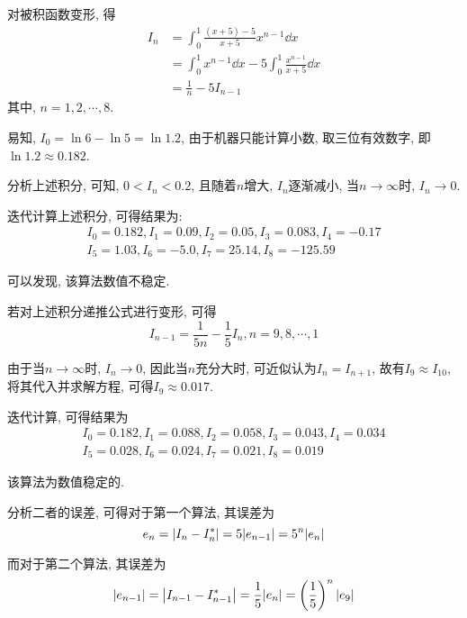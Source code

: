 \begin{solution}
    对被积函数变形, 得
    \begin{align*}
        I_n &= \int_0^1\frac{(x+5)-5}{x+5}x^{n-1}\dd{x}\\
            &= \int_0^1x^{n-1}\dd{x}-5\int_0^1\frac{x^{n-1}}{x+5}\dd{x}\\
            &= \frac{1}{n}-5I_{n-1}
    \end{align*}
    其中, $n=1,2,\cdots,8$.

    易知, $I_0=\ln{6}-\ln{5}=\ln{1.2}$, 由于机器只能计算小数, 取三位有效数字, 即$\ln{1.2}\approx0.182$.

    分析上述积分, 可知, $0<I_n<0.2$, 且随着$n$增大, $I_n$逐渐减小, 当$n\to\infty$时, $I_n\to0$.

    迭代计算上述积分, 可得结果为:
    \begin{align*}
        I_0=0.182, I_1=0.09, I_2=0.05, I_3=0.083, I_4=-0.17\\
        I_5=1.03, I_6=-5.0, I_7=25.14, I_8=-125.59
    \end{align*}

    可以发现, 该算法数值不稳定.

    若对上述积分递推公式进行变形, 可得
    \begin{equation*}
        I_{n-1}=\frac{1}{5n}-\frac{1}{5}I_n, n=9,8,\cdots,1
    \end{equation*}

    由于当$n\to\infty$时, $I_n\to 0$, 因此当$n$充分大时, 可近似认为$I_n=I_{n+1}$, 故有$I_9\approx I_10$, 
    将其代入并求解方程, 可得$I_9\approx0.017$.

    迭代计算, 可得结果为
    \begin{align*}
        I_0=0.182, I_1=0.088, I_2=0.058, I_3=0.043, I_4=0.034\\
        I_5=0.028, I_6=0.024, I_7=0.021, I_8=0.019
    \end{align*}

    该算法为数值稳定的.

    分析二者的误差, 可得对于第一个算法, 其误差为
    \begin{equation*}
        e_n=\abs{I_n-I_n^*}=5\abs{e_{n-1}}=5^n\abs{e_n}
    \end{equation*}
    
    而对于第二个算法, 其误差为
    \begin{equation*}
        \abs{e_{n-1}}=\abs{I_{n-1}-I_{n-1}^*}=\frac{1}{5}\abs{e_n}=\left(\frac{1}{5}\right)^n\abs{e_9}
    \end{equation*}

\end{solution}

